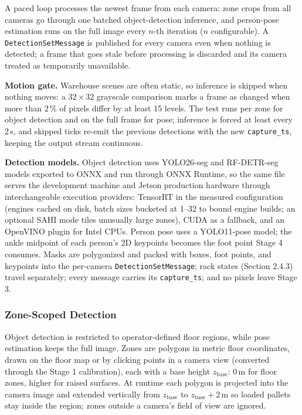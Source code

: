 \documentclass[9pt,a4paper,twocolumn]{rho-class/rho}
\begin{document}
A paced loop processes the newest frame from each camera: zone crops from all cameras go through one batched object-detection inference, and person-pose estimation runs on the full image every $n$-th iteration ($n$ configurable). A \texttt{DetectionSetMessage} is published for every camera even when nothing is detected; a frame that goes stale before processing is discarded and its camera treated as temporarily unavailable.

\textbf{Motion gate.} Warehouse scenes are often static, so inference is skipped when nothing moves: a $32 \times 32$ grayscale comparison marks a frame as changed when more than 2\,\% of pixels differ by at least 15 levels. The test runs per zone for object detection and on the full frame for pose; inference is forced at least every 2\,s, and skipped ticks re-emit the previous detections with the new \texttt{capture\_ts}, keeping the output stream continuous.

\textbf{Detection models.} Object detection uses YOLO26-seg and RF-DETR-seg models exported to ONNX and run through ONNX Runtime, so the same file serves the development machine and Jetson production hardware through interchangeable execution providers: TensorRT in the measured configuration (engines cached on disk, batch sizes bucketed at 1--32 to bound engine builds; an optional SAHI mode tiles unusually large zones), CUDA as a fallback, and an OpenVINO plugin for Intel CPUs. Person pose uses a YOLO11-pose model; the ankle midpoint of each person's 2D keypoints becomes the foot point Stage 4 consumes. Masks are polygonized and packed with boxes, foot points, and keypoints into the per-camera \texttt{DetectionSetMessage}; rack states (Section 2.4.3) travel separately; every message carries its \texttt{capture\_ts}; and no pixels leave Stage 3.

\subsubsection{Zone-Scoped Detection}

Object detection is restricted to operator-defined floor regions, while pose estimation keeps the full image. Zones are polygons in metric floor coordinates, drawn on the floor map or by clicking points in a camera view (converted through the Stage 1 calibration), each with a base height $z_{\text{base}}$: 0\,m for floor zones, higher for raised surfaces. At runtime each polygon is projected into the camera image and extended vertically from $z_{\text{base}}$ to $z_{\text{base}} + 2$\,m so loaded pallets stay inside the region; zones outside a camera's field of view are ignored.
\end{document}
